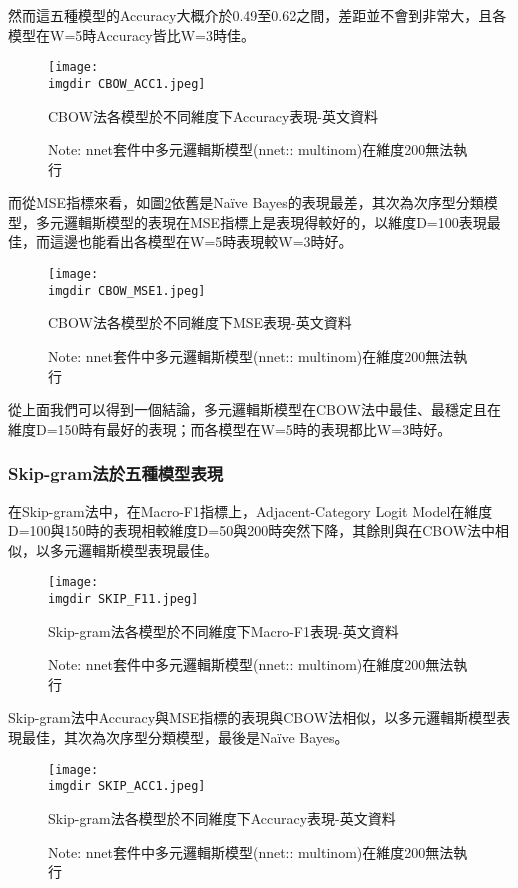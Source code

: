 	然而這五種模型的Accuracy大概介於0.49至0.62之間，差距並不會到非常大，且各模型在W=5時Accuracy皆比W=3時佳。
	
\begin{figure}[H]
    \centering
        \texttt{[image: \\imgdir CBOW\_ACC1.jpeg]}
    \caption{CBOW法各模型於不同維度下Accuracy表現-英文資料}
    \label{pic.5.3.6-2}
    \caption*{\footnotesize{Note: nnet套件中多元邏輯斯模型(nnet:: multinom)在維度200無法執行}}
\end{figure}	
	
	而從MSE指標來看，如圖\ref{pic.5.3.6-3}依舊是Naïve Bayes的表現最差，其次為次序型分類模型，多元邏輯斯模型的表現在MSE指標上是表現得較好的，以維度D=100表現最佳，而這邊也能看出各模型在W=5時表現較W=3時好。
	
\begin{figure}[H]
    \centering
        \texttt{[image: \\imgdir CBOW\_MSE1.jpeg]}
    \caption{CBOW法各模型於不同維度下MSE表現-英文資料}
    \label{pic.5.3.6-3}
    \caption*{\footnotesize{Note: nnet套件中多元邏輯斯模型(nnet:: multinom)在維度200無法執行}}
\end{figure}	
	
	從上面我們可以得到一個結論，多元邏輯斯模型在CBOW法中最佳、最穩定且在維度D=150時有最好的表現；而各模型在W=5時的表現都比W=3時好。
	
	
\subsubsection{Skip-gram法於五種模型表現}

	在Skip-gram法中，在Macro-F1指標上，Adjacent-Category Logit Model在維度D=100與150時的表現相較維度D=50與200時突然下降，其餘則與在CBOW法中相似，以多元邏輯斯模型表現最佳。
		
\begin{figure}[H]
    \centering
        \texttt{[image: \\imgdir SKIP\_F11.jpeg]}
    \caption{Skip-gram法各模型於不同維度下Macro-F1表現-英文資料}
    \label{pic.5.3.7-1}
    \caption*{\footnotesize{Note: nnet套件中多元邏輯斯模型(nnet:: multinom)在維度200無法執行}}
\end{figure}
	
	Skip-gram法中Accuracy與MSE指標的表現與CBOW法相似，以多元邏輯斯模型表現最佳，其次為次序型分類模型，最後是Naïve Bayes。
	
\begin{figure}[H]
    \centering
        \texttt{[image: \\imgdir SKIP\_ACC1.jpeg]}
    \caption{Skip-gram法各模型於不同維度下Accuracy表現-英文資料}
    \label{pic.5.3.7-2}
    \caption*{\footnotesize{Note: nnet套件中多元邏輯斯模型(nnet:: multinom)在維度200無法執行}}
\end{figure}	
	
